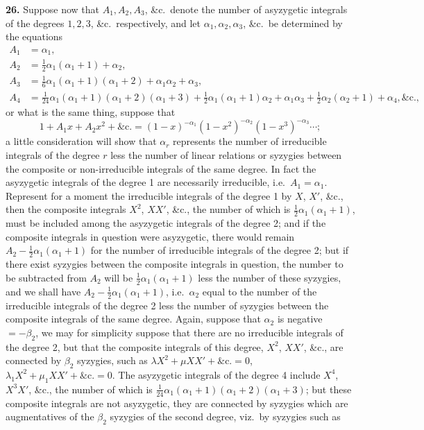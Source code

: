\documentclass[11pt]{article}
\begin{document}
\textbf{26.} Suppose now that $A_1, A_2, A_3$, \&c.\ denote the number of asyzygetic integrals of the degrees $1, 2, 3$, \&c.\ respectively, and let $\alpha_1, \alpha_2, \alpha_3$, \&c.\ be determined by the equations
\begin{align*}
A_1 &= \alpha_1, \\
A_2 &= \tfrac{1}{2}\alpha_1(\alpha_1 + 1) + \alpha_2, \\
A_3 &= \tfrac{1}{6}\alpha_1(\alpha_1 + 1)(\alpha_1 + 2) + \alpha_1 \alpha_2 + \alpha_3, \\
A_4 &= \tfrac{1}{24}\alpha_1(\alpha_1 + 1)(\alpha_1 + 2)(\alpha_1 + 3) + \tfrac{1}{2}\alpha_1(\alpha_1 + 1)\alpha_2 + \alpha_1 \alpha_3 + \tfrac{1}{2}\alpha_2(\alpha_2 + 1) + \alpha_4, \&\text{c.},
\end{align*}
or what is the same thing, suppose that
\[
1 + A_1 x + A_2 x^2 + \&\text{c.} = (1 - x)^{-\alpha_1}(1 - x^2)^{-\alpha_2}(1 - x^3)^{-\alpha_3}\cdots;
\]
a little consideration will show that $\alpha_r$ represents the number of irreducible integrals of the degree $r$ less the number of linear relations or syzygies between the composite or non-irreducible integrals of the same degree. In fact the asyzygetic integrals of the degree 1 are necessarily irreducible, i.e.\ $A_1 = \alpha_1$. Represent for a moment the irreducible integrals of the degree 1 by $X$, $X'$, \&c., then the composite integrals $X^2$, $XX'$, \&c., the number of which is $\tfrac{1}{2}\alpha_1(\alpha_1 + 1)$, must be included among the asyzygetic integrals of the degree 2; and if the composite integrals in question were asyzygetic, there would remain $A_2 - \tfrac{1}{2}\alpha_1(\alpha_1 + 1)$ for the number of irreducible integrals of the degree 2; but if there exist syzygies between the composite integrals in question, the number to be subtracted from $A_2$ will be $\tfrac{1}{2}\alpha_1(\alpha_1 + 1)$ less the number of these syzygies, and we shall have $A_2 - \tfrac{1}{2}\alpha_1(\alpha_1 + 1)$, i.e.\ $\alpha_2$ equal to the number of the irreducible integrals of the degree 2 less the number of syzygies between the composite integrals of the same degree. Again, suppose that $\alpha_2$ is negative $= -\beta_2$, we may for simplicity suppose that there are no irreducible integrals of the degree 2, but that the composite integrals of this degree, $X^2$, $XX'$, \&c., are connected by $\beta_2$ syzygies, such as $\lambda X^2 + \mu XX' + \&\text{c.} = 0$, $\lambda_1 X^2 + \mu_1 XX' + \&\text{c.} = 0$. The asyzygetic integrals of the degree 4 include $X^4$, $X^3 X'$, \&c., the number of which is $\tfrac{1}{24}\alpha_1(\alpha_1 + 1)(\alpha_1 + 2)(\alpha_1 + 3)$; but these composite integrals are not asyzygetic, they are connected by syzygies which are augmentatives of the $\beta_2$ syzygies of the second degree, viz.\ by syzygies such as
\end{document}
